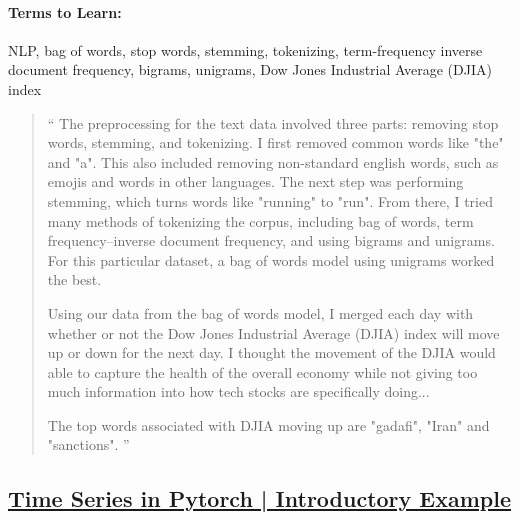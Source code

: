 \paragraph*{Terms to Learn: } NLP, bag of words, stop words, stemming, tokenizing, term-frequency inverse document frequency, bigrams, unigrams, Dow Jones Industrial Average (DJIA) index

\begin{quotation}
	`` The preprocessing for the text data involved three parts: removing stop words, stemming, and tokenizing. I first removed common words like "the" and "a". This also included removing non-standard english words, such as emojis and words in other languages. The next step was performing stemming, which turns words like "running" to "run". From there, I tried many methods of tokenizing the corpus, including bag of words, term frequency–inverse document frequency, and using bigrams and unigrams. For this particular dataset, a bag of words model using unigrams worked the best.

	Using our data from the bag of words model, I merged each day with whether or not the Dow Jones Industrial Average (DJIA) index will move up or down for the next day. I thought the movement of the DJIA would able to capture the health of the overall economy while not giving too much information into how tech stocks are specifically doing...

	The top words associated with DJIA moving up are "gadafi", "Iran" and "sanctions". ''
\end{quotation}


\subsection{\href{https://stackabuse.com/time-series-prediction-using-lstm-with-pytorch-in-python/}{Time Series in Pytorch | Introductory Example}}

